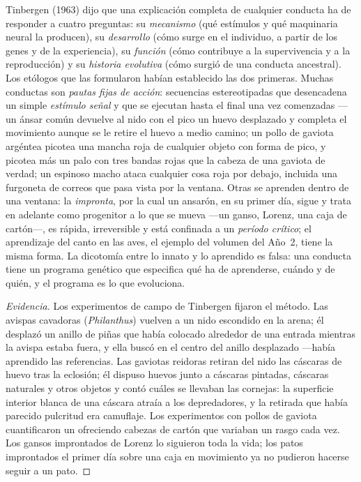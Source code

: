 \begin{definition}\label{def:b3:behavioural-ecology:tinbergen}
Tinbergen (1963) dijo que una explicación completa de cualquier
conducta ha de responder a cuatro preguntas: su \emph{mecanismo} (qué
estímulos y qué maquinaria neural la producen), su \emph{desarrollo}
(cómo surge en el individuo, a partir de los genes y de la
experiencia), su \emph{función} (cómo contribuye a la supervivencia y a
la reproducción) y su \emph{historia evolutiva} (cómo surgió de una
conducta ancestral). Los etólogos que las formularon habían establecido
las dos primeras. Muchas conductas son \emph{pautas fijas de acción}:
secuencias estereotipadas que desencadena un simple \emph{estímulo
señal} y que se ejecutan hasta el final una vez comenzadas ---un ánsar
común devuelve al nido con el pico un huevo desplazado y completa el
movimiento aunque se le retire el huevo a medio camino; un pollo de
gaviota argéntea picotea una mancha roja de cualquier objeto con forma
de pico, y picotea más un palo con tres bandas rojas que la cabeza de
una gaviota de verdad; un espinoso macho ataca cualquier cosa roja por
debajo, incluida una furgoneta de correos que pasa vista por la
ventana. Otras se aprenden dentro de una ventana: la \emph{impronta},
por la cual un ansarón, en su primer día, sigue y trata en adelante
como progenitor a lo que se mueva ---un ganso, Lorenz, una caja de
cartón---, es rápida, irreversible y está confinada a un
\emph{período crítico}; el aprendizaje del canto en las aves, el ejemplo
del volumen del Año~2, tiene la misma forma. La dicotomía entre lo
innato y lo aprendido es falsa: una conducta tiene un programa genético
que especifica qué ha de aprenderse, cuándo y de quién, y el programa
es lo que evoluciona.
\end{definition}

\begin{proof}[Evidencia]
Los experimentos de campo de Tinbergen fijaron el método. Las avispas
cavadoras (\emph{Philanthus}) vuelven a un nido escondido en la arena;
él desplazó un anillo de piñas que había colocado alrededor de una
entrada mientras la avispa estaba fuera, y ella buscó en el centro del
anillo desplazado ---había aprendido las referencias. Las gaviotas
reidoras retiran del nido las cáscaras de huevo tras la eclosión; él
dispuso huevos junto a cáscaras pintadas, cáscaras naturales y otros
objetos y contó cuáles se llevaban las cornejas: la superficie interior
blanca de una cáscara atraía a los depredadores, y la retirada que
había parecido pulcritud era camuflaje. Los experimentos con pollos de
gaviota cuantificaron un  ofreciendo cabezas de cartón
que variaban un rasgo cada vez. Los gansos improntados de Lorenz lo
siguieron toda la vida; los patos improntados el primer día sobre una
caja en movimiento ya no pudieron hacerse seguir a un pato.
\end{proof}


